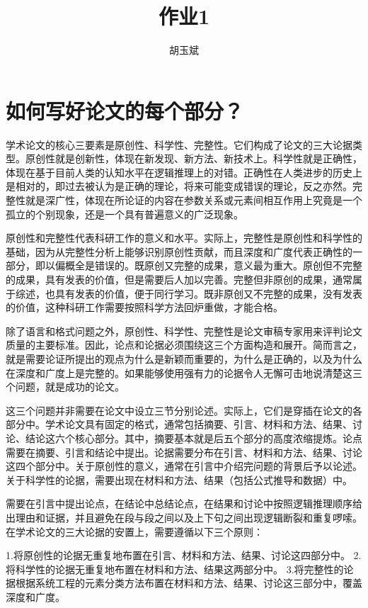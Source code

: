 \documentclass[onecolumn,oneside]{BUPTHomework}
\author{胡玉斌}
\title{作业1}
\begin{document}
  \maketitle

  \section*{如何写好论文的每个部分？}

  学术论文的核心三要素是原创性、科学性、完整性。它们构成了论文的三大论据类型。原创性就是创新性，体现在新发现、新方法、新技术上。科学性就是正确性，体现在基于目前人类的认知水平在逻辑推理上的对错。正确性在人类进步的历史上是相对的，即过去被认为是正确的理论，将来可能变成错误的理论，反之亦然。完整性就是深广性，体现在所论证的内容在参数关系或元素间相互作用上究竟是一个孤立的个别现象，还是一个具有普遍意义的广泛现象。

  原创性和完整性代表科研工作的意义和水平。实际上，完整性是原创性和科学性的基础，因为从完整性分析上能够识别原创性贡献，而且深度和广度代表正确性的一部分，即以偏概全是错误的。既原创又完整的成果，意义最为重大。原创但不完整的成果，具有发表的价值，但是需要后人加以完善。完整但非原创的成果，通常属于综述，也具有发表的价值，便于同行学习。既非原创又不完整的成果，没有发表的价值，这种科研工作需要按照科学方法回炉重做，才能合格。

  除了语言和格式问题之外，原创性、科学性、完整性是论文审稿专家用来评判论文质量的主要标准。因此，论点和论据必须围绕这三个方面构造和展开。简而言之，就是需要论证所提出的观点为什么是新颖而重要的，为什么是正确的，以及为什么在深度和广度上是完整的。如果能够使用强有力的论据令人无懈可击地说清楚这三个问题，就是成功的论文。

  这三个问题并非需要在论文中设立三节分别论述。实际上，它们是穿插在论文的各部分中。学术论文具有固定的格式，通常包括摘要、引言、材料和方法、结果、讨论、结论这六个核心部分。其中，摘要基本就是后五个部分的高度浓缩提炼。论点需要在摘要、引言和结论中提出。论据需要分布在引言、材料和方法、结果、讨论这四个部分中。关于原创性的意义，通常在引言中介绍完问题的背景后予以论述。关于科学性的论据，需要出现在材料和方法、结果（包括公式推导和数据）中。

  需要在引言中提出论点，在结论中总结论点，在结果和讨论中按照逻辑推理顺序给出理由和证据，并且避免在段与段之间以及上下句之间出现逻辑断裂和重复啰嗦。在学术论文的三大论据的安置上，需要遵循以下三个原则：

  1.将原创性的论据无重复地布置在引言、材料和方法、结果、讨论这四部分中。
  2.将科学性的论据无重复地布置在材料和方法、结果这两部分中。
  3.将完整性的论据根据系统工程的元素分类方法布置在材料和方法、结果、讨论这三部分中，覆盖深度和广度。
\end{document}
